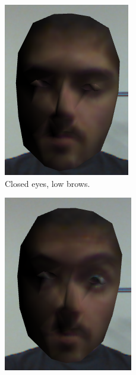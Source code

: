 \begin{figure}[H]
\begin{subfigure}{.3\textwidth}
		\includegraphics[width=0.8\linewidth]{sections/analysis/sensorselection/kinect/texture_closed_eyes}
		\caption{Closed eyes, low brows.}\label{[KINECT][TEXTURED] Closed eyes, low brows}
	\end{subfigure}\hfill%
	\begin{subfigure}{.3\textwidth}
		\centering
		\includegraphics[width=0.8\linewidth]{sections/analysis/sensorselection/kinect/texture_brows_high}

\end{subfigure}
\end{figure}
